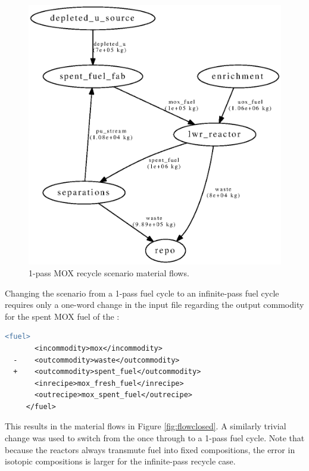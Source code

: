 \begin{figure}[H]
\begin{center}
\includegraphics{./images/flow-mod-open-1.eps}
\end{center}
\caption{1-pass \gls{MOX} recycle scenario material flows.}
\label{fig:flowmodopen}
\end{figure}

Changing the scenario from a 1-pass fuel cycle to an infinite-pass fuel cycle
requires only a one-word change in the input file regarding the output
commodity for the spent \gls{MOX} fuel of the : 

\begin{lstlisting}[language=diff]
     <fuel>         
       <incommodity>mox</incommodity>
  -    <outcommodity>waste</outcommodity>
  +    <outcommodity>spent_fuel</outcommodity>
       <inrecipe>mox_fresh_fuel</inrecipe>
       <outrecipe>mox_spent_fuel</outrecipe>
     </fuel>
\end{lstlisting}

This results in the material flows in Figure \ref{fig:flowclosed}.  A
similarly trivial change was used to switch from the once through to a 1-pass
fuel cycle.  Note that because the reactors always transmute fuel into fixed
compositions, the error in isotopic compositions is larger for the
infinite-pass recycle case.

